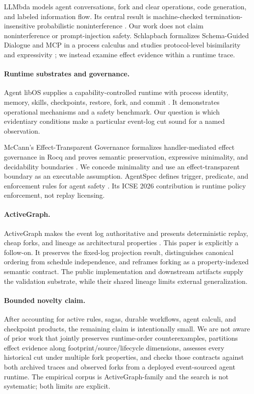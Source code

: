 LLMbda models agent conversations, fork and clear operations, code generation,
and labeled information flow.  Its central result is machine-checked
termination-insensitive probabilistic noninterference
\cite{garby2026llmbda}.  Our work does not claim noninterference or
prompt-injection safety.  Schlapbach formalizes Schema-Guided Dialogue and MCP
in a process calculus and studies protocol-level bisimilarity and expressivity
\cite{schlapbach2026protocols}; we instead examine effect evidence within a
runtime trace.

\paragraph{Runtime substrates and governance.}
Agent libOS supplies a capability-controlled runtime with process identity,
memory, skills, checkpoints, restore, fork, and commit
\cite{zhang2026libos}.  It demonstrates operational mechanisms and a safety
benchmark.  Our question is which evidentiary conditions make a particular
event-log cut sound for a named observation.

McCann's Effect-Transparent Governance formalizes handler-mediated effect
governance in Rocq and proves semantic preservation, expressive minimality, and
decidability boundaries \cite{mccann2026governance}.  We concede minimality and
use an effect-transparent boundary as an executable assumption.  AgentSpec
defines trigger, predicate, and enforcement rules for agent safety
\cite{wang2026agentspec}.  Its ICSE 2026 contribution is runtime policy
enforcement, not replay licensing.

\paragraph{ActiveGraph.}
ActiveGraph makes the event log authoritative and presents deterministic
replay, cheap forks, and lineage as architectural properties
\cite{nakajima2026log}.  This paper is explicitly a follow-on.  It preserves
the fixed-log projection result, distinguishes canonical ordering from schedule
independence, and reframes forking as a property-indexed semantic contract.
The public implementation and downstream artifacts supply the validation
substrate, while their shared lineage limits external generalization.

\paragraph{Bounded novelty claim.}
After accounting for active rules, sagas, durable workflows, agent calculi, and
checkpoint products, the remaining claim is intentionally small.  We are not
aware of prior work that jointly preserves runtime-order counterexamples,
partitions effect evidence along footprint/source/lifecycle dimensions,
assesses every historical cut under multiple fork properties, and checks those
contracts against both archived traces and observed forks from a deployed
event-sourced agent runtime.  The empirical corpus is ActiveGraph-family and
the search is not systematic; both limits are explicit.
